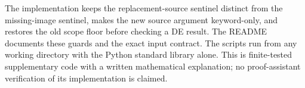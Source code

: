 The implementation keeps the replacement-source sentinel distinct from
the missing-image sentinel, makes the new source argument keyword-only,
and restores the old scope floor before checking a DE result. The README
documents these guards and the exact input contract. The scripts run from
any working directory with the Python standard library alone. This is
finite-tested supplementary code with a written mathematical explanation;
no proof-assistant verification of its implementation is claimed.
